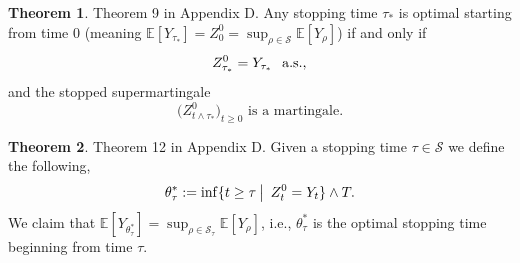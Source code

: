 \documentclass[12pt]{article}
\newcommand{\cF}{\mathcal{F}}
\newcommand{\cS}{\mathcal{S}}
\newcommand{\E}{\mathbb{E}}
\newcommand{\Prb}{\mathbb{P}}
\newcommand{\quantifyspace}{\hspace{2px} \big | \hspace{5px}}
\newcommand{\spc}{\hspace{7 px}}
\newcommand{\als}{\text{a.s.}}
\newcommand{\QED}{\hspace*{\fill}\textup{QED}}
\theoremstyle{definition}
\newtheorem{thm}{Theorem}
\begin{document}
\begin{thm} \cite{karatzas1998} Theorem 9 in Appendix D.
    Any stopping time $\tau_*$ is optimal starting from time 0 (meaning $\E[Y_{\tau_*}] = Z^0_0 = \sup_{\rho \in \cS} \E[Y_\rho]$) if and only if
    \[
        Z^0_{\tau_*} = Y_{\tau_*} \spc \als,
    \]
    and the stopped supermartingale
    \[
        \big ( Z^0_{t \wedge \tau_*} \big )_{t \geq 0} \text{ is a martingale.}
    \]

\end{thm}

\begin{thm} \cite{karatzas1998} Theorem 12 in Appendix D.
    Given a stopping time $\tau \in \cS$ we define the following,
    \[
        \theta_\tau^* := \inf \{t \geq \tau \quantifyspace Z^0_t = Y_t \} \wedge T.
    \]
    We claim that $\E[Y_{\theta_\tau^*}] = \sup_{\rho \in \cS_\tau} \E[Y_\rho]$, i.e., $\theta_\tau^*$ is the optimal stopping time beginning from time $\tau$.
\end{thm}
\end{document}
